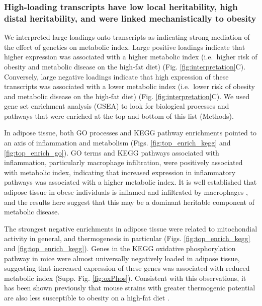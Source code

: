 \documentclass[
]{article}
\begin{document}
\subsubsection{High-loading transcripts have low local heritability,
high distal heritability, and were linked mechanistically to
obesity}\label{high-loading-transcripts-have-low-local-heritability-high-distal-heritability-and-were-linked-mechanistically-to-obesity}

We interpreted large loadings onto transcripts as indicating strong
mediation of the effect of genetics on metabolic index. Large positive
loadings indicate that higher expression was associated with a higher
metabolic index (i.e.~higher risk of obesity and metabolic disease on
the high-fat diet) (Fig. \ref{fig:interpretation}C). Conversely, large
negative loadings indicate that high expression of these transcripts was
associated with a lower metabolic index (i.e.~lower risk of obesity and
metabolic disease on the high-fat diet) (Fig.
\ref{fig:interpretation}C). We used gene set enrichment analysis (GSEA)
\cite{fgsea, 
pmid16199517} to look for biological processes and pathways that were
enriched at the top and bottom of this list (Methods).

In adipose tissue, both GO processes and KEGG pathway enrichments
pointed to an axis of inflammation and metabolism (Figs.
\ref{fig:top_enrich_kegg} and \ref{fig:top_enrich_go}). GO terms and
KEGG pathways associated with inflammation, particularly macrophage
infiltration, were positively associated with metabolic index,
indicating that increased expression in inflammatory pathways was
associated with a higher metabolic index. It is well established that
adipose tissue in obese individuals is inflamed and infiltrated by
macrophages \cite{pmid19133410, 
pmid28955384, pmid28912810, pmid28901330, pmid24969772}, and the results
here suggest that this may be a dominant heritable component of
metabolic disease.

The strongest negative enrichments in adipose tissue were related to
mitochondial activity in general, and thermogenesis in particular (Figs.
\ref{fig:top_enrich_kegg} and \ref{fig:top_enrich_kegg}). Genes in the
KEGG oxidative phosphorylation pathway in mice were almost universally
negatively loaded in adipose tissue, suggesting that increased
expression of these genes was associated with reduced metabolic index
(Supp. Fig. \ref{fig:oxPhos}). Consistent with this observations, it has
been shown previously that mouse strains with greater thermogenic
potential are also less susceptible to obesity on a high-fat diet
\cite{pmid18492779}.
\end{document}

